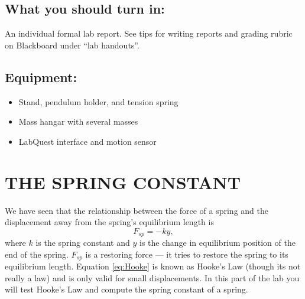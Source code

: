 \documentclass[11pt,letterpaper]{article}
\begin{document}
\subsection*{What you should turn in:} An individual formal lab report. See tips for writing reports and grading rubric on Blackboard under ``lab handouts''. %

\subsection*{Equipment:}
\begin{itemize}
\setlength{\parskip}{3pt}  
\item Stand, pendulum holder, and tension spring
\item Mass hangar with several masses
\item LabQuest interface and motion sensor
\end{itemize}


\section{THE SPRING CONSTANT}
We have seen that the relationship between the force of a spring and the displacement away from the spring's equilibrium length is 
\begin{equation}
F_{sp}=-ky,
\label{eq:Hooke}
\end{equation} 
where $k$ is the spring constant and $y$ is the change in equilibrium position of the end of the spring. $F_{sp}$ is a restoring force --- it tries to restore the spring to its equilibrium length. Equation \ref{eq:Hooke} is known as Hooke's Law (though its not really a law) and is only valid for small displacements. In this part of the lab you will test Hooke's Law and compute the spring constant of a spring.
\end{document}
